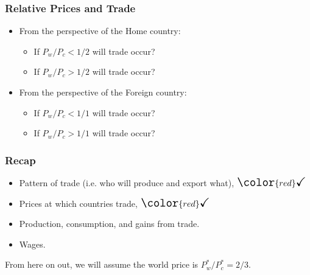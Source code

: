 \documentclass[handout]{beamer}
\begin{document}

\begin{frame}[t]
\frametitle{Relative Prices and Trade}
\bigskip
\begin{itemize}
\item From the perspective of the Home country:
\begin{itemize}
\medskip
\item If $P_w/P_c < 1/2$ will trade occur?
\bigskip
\item If $P_w/P_c > 1/2$ will trade occur?
\end{itemize}
\bigskip
\medskip
\item From the perspective of the Foreign country:
\begin{itemize}
\medskip
\item If $P_w/P_c < 1/1$ will trade occur?
\bigskip
\item If $P_w/P_c > 1/1$ will trade occur?
\end{itemize}
\end{itemize}
\end{frame}

\begin{frame}[t]
\frametitle{Recap}
\bigskip
\begin{itemize}
\medskip
\item Pattern of trade (i.e. who will produce and export what), $\Large {\color{red}\checkmark}$
\medskip
\item Prices at which countries trade, $\Large {\color{red}\checkmark}$
\medskip
\item Production, consumption, and gains from trade.
\medskip
\item Wages.
\end{itemize}
\bigskip
\bigskip
From here on out, we will assume the world price is $P^*_w/P^*_c = 2/3$.
\end{frame}

\end{document}
